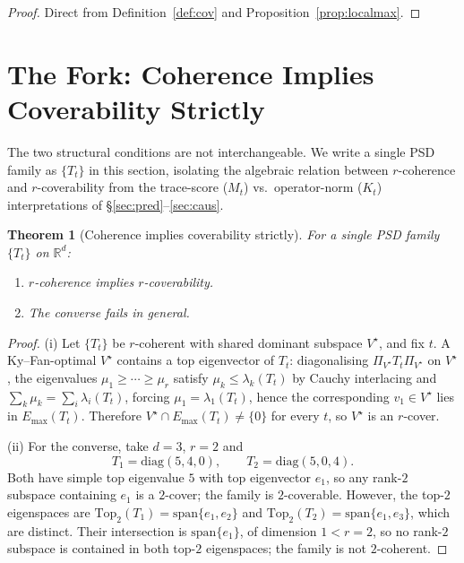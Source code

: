 \documentclass[final,3p,times]{elsarticle}
\newtheorem{theorem}{Theorem}
\newcommand{\R}{\mathbb{R}}
\newcommand{\Emax}{E_{\max}}
\begin{document}
\begin{proof}
Direct from Definition~\ref{def:cov} and Proposition~\ref{prop:localmax}.
\end{proof}

\section{The Fork: Coherence Implies Coverability Strictly}
\label{sec:fork}

The two structural conditions are not interchangeable.
We write a single PSD family as $\{T_t\}$ in this section, isolating the
algebraic relation between $r$-coherence and $r$-coverability from the
trace-score ($M_t$) vs.\ operator-norm ($K_t$) interpretations of
\S\ref{sec:pred}--\ref{sec:caus}.

\begin{theorem}[Coherence implies coverability strictly]\label{thm:fork}
For a single PSD family $\{T_t\}$ on $\R^d$:
\begin{enumerate}
\item[(i)] $r$-coherence implies $r$-coverability.
\item[(ii)] The converse fails in general.
\end{enumerate}
\end{theorem}

\begin{proof}
(i) Let $\{T_t\}$ be $r$-coherent with shared dominant subspace
$V^\star$, and fix $t$.
A Ky--Fan-optimal $V^\star$ contains a top eigenvector of $T_t$:
diagonalising $\Pi_{V^\star}T_t\Pi_{V^\star}$ on $V^\star$, the eigenvalues
$\mu_1\ge\cdots\ge\mu_r$ satisfy $\mu_k\le\lambda_k(T_t)$ by Cauchy
interlacing \cite{HornJohnson2013} and $\sum_k\mu_k=\sum_i\lambda_i(T_t)$,
forcing $\mu_1=\lambda_1(T_t)$, hence the corresponding $v_1\in V^\star$
lies in $\Emax(T_t)$.
Therefore $V^\star\cap\Emax(T_t)\ne\{0\}$ for every $t$, so $V^\star$ is
an $r$-cover.

(ii) For the converse, take $d=3$, $r=2$ and
\begin{equation}\label{eq:forkwitness}
T_1=\mathrm{diag}(5,4,0),\qquad
T_2=\mathrm{diag}(5,0,4).
\end{equation}
Both have simple top eigenvalue $5$ with top eigenvector $e_1$, so any
rank-$2$ subspace containing $e_1$ is a $2$-cover; the family is
$2$-coverable.
However, the top-$2$ eigenspaces are
$\mathrm{Top}_2(T_1)=\mathrm{span}\{e_1,e_2\}$ and
$\mathrm{Top}_2(T_2)=\mathrm{span}\{e_1,e_3\}$, which are distinct.
Their intersection is $\mathrm{span}\{e_1\}$, of dimension $1<r=2$, so no
rank-$2$ subspace is contained in both top-$2$ eigenspaces; the family
is not $2$-coherent.
\end{proof}
\end{document}

